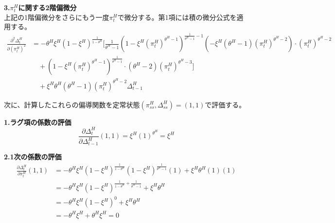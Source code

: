 \textbf{3.\(\pi_t^H\)に関する2階偏微分} \\
上記の1階偏微分をさらにもう一度\(\pi_t^H\)で微分する。第1項には積の微分公式を適用する。
\begin{align}
    \frac{\partial^2\Delta_t^H}{\partial(\pi_t^H)^2}&=-\theta^H\xi^H(1-\xi^H)^{\frac{1}{1-\theta^H}}\Bigg[\frac{1}{\theta^H-1}\left(1-\xi^H(\pi_t^H)^{\theta^H-1}\right)^{\frac{1}{\theta^H-1}-1}(-\xi^H(\theta^H-1)(\pi_t^H)^{\theta^H-2})\cdot(\pi_t^H)^{\theta^H-2} \label{eq:appendix_welfare_correction_derivation_pi_second_diff_step1} \\
    &\quad+\left(1-\xi^H(\pi_t^H)^{\theta^H-1}\right)^{\frac{1}{\theta^H-1}}\cdot(\theta^H-2)(\pi_t^H)^{\theta^H-3}\Bigg] \label{eq:appendix_welfare_correction_derivation_pi_second_diff_step2} \\
    &\quad+\xi^H\theta^H(\theta^H-1)(\pi_t^H)^{\theta^H-2}\Delta_{t-1}^H
\label{eq:appendix_welfare_correction_derivation_pi_second_diff}
\end{align}

次に、計算したこれらの偏導関数を定常状態\((\pi_{ss}^H,\Delta_{ss}^H)=(1,1)\)で評価する。

\textbf{1.ラグ項の係数の評価}
\begin{equation}
    \frac{\partial\Delta_t^H}{\partial\Delta_{t-1}^H}(1,1)=\xi^H(1)^{\theta^H}=\xi^H
\label{eq:appendix_welfare_correction_derivation_eval_lag}
\end{equation}

\textbf{2.1次の係数の評価}
\begin{align}
    \frac{\partial\Delta_t^H}{\partial\pi_t^H}(1,1)&=-\theta^H\xi^H(1-\xi^H)^{\frac{1}{1-\theta^H}}\left(1-\xi^H\right)^{\frac{1}{\theta^H-1}}(1)+\xi^H\theta^H(1)(1) \label{eq:appendix_welfare_correction_derivation_eval_pi_first_step1} \\
    &=-\theta^H\xi^H(1-\xi^H)^{\frac{1}{1-\theta^H}+\frac{1}{\theta^H-1}}+\xi^H\theta^H \label{eq:appendix_welfare_correction_derivation_eval_pi_first_step2} \\
    &=-\theta^H\xi^H(1-\xi^H)^0+\xi^H\theta^H \label{eq:appendix_welfare_correction_derivation_eval_pi_first_step3} \\
    &=-\theta^H\xi^H+\theta^H\xi^H=0
\label{eq:appendix_welfare_correction_derivation_eval_pi_first}
\end{align}

